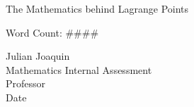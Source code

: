 \begin{titlepage}
	\begin{center}
		\vspace*{\fill}
		
		The Mathematics behind Lagrange Points
		
		\vspace*{1.0cm}
		Word Count: \#\#\#\#
		
		\vfill
		
		Julian Joaquin\\
		Mathematics Internal Assessment\\
		Professor\\
		Date
		
		\vspace*{\fill}
		
	\end{center}
\end{titlepage}